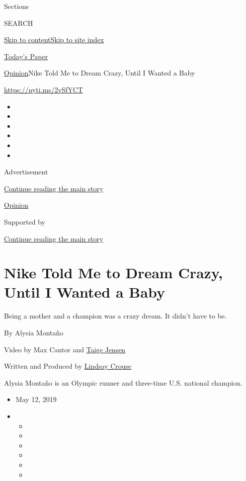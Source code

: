 Sections

SEARCH

\protect\hyperlink{site-content}{Skip to
content}\protect\hyperlink{site-index}{Skip to site index}

\href{https://myaccount.nytimes3xbfgragh.onion/auth/login?response_type=cookie\&client_id=vi}{}

\href{https://www.nytimes3xbfgragh.onion/section/todayspaper}{Today's
Paper}

\href{/section/opinion}{Opinion}\textbar{}Nike Told Me to Dream Crazy,
Until I Wanted a Baby

\url{https://nyti.ms/2vSfYCT}

\begin{itemize}
\item
\item
\item
\item
\item
\item
\end{itemize}

Advertisement

\protect\hyperlink{after-top}{Continue reading the main story}

\href{/section/opinion}{Opinion}

Supported by

\protect\hyperlink{after-sponsor}{Continue reading the main story}

\hypertarget{nike-told-me-to-dream-crazy-until-i-wanted-a-baby}{%
\section{Nike Told Me to Dream Crazy, Until I Wanted a
Baby}\label{nike-told-me-to-dream-crazy-until-i-wanted-a-baby}}

Being a mother and a champion was a crazy dream. It didn't have to be.

By Alysia Montaño

Video by Max Cantor and
\href{https://www.nytimes3xbfgragh.onion/by/taige-jensen}{Taige Jensen}

Written and Produced by
\href{https://www.nytimes3xbfgragh.onion/by/lindsay-crouse}{Lindsay
Crouse}

Alysia Montaño is an Olympic runner and three-time U.S. national
champion.

\begin{itemize}
\item
  May 12, 2019
\item
  \begin{itemize}
  \item
  \item
  \item
  \item
  \item
  \item
  \end{itemize}
\end{itemize}

